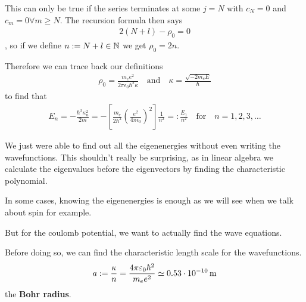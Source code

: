 This can only be true if the series terminates at some $j = N$ with $c_N = 0$ and $c_m = 0 \forall m \geq N$.
The recursion formula then says
\begin{align*}
	2(N+l) - \rho_0 = 0
\end{align*}
, so if we define $n := N + l \in \mathbb{N}$ we get $\rho_0 = 2n$.

Therefore we can trace back our definitions
\begin{align*}
	\rho_0 = \frac{m_e e^{2}}{2 \pi \epsilon_0 \hbar^{2} \kappa} \quad \text{and} \quad \kappa = \frac{\sqrt{-2m_e E}}{\hbar}
\end{align*}
to find that
\begin{align*}
	E_n = - \frac{\hbar^{2} \kappa_n^{2}}{2m} 
	=
	-\left[
		\frac{m_e}{2 \hbar^2} \left(
			\frac{e^{2}}{4\pi \epsilon_0}
		\right)^{2}		
	\right]
	\frac{1}{n^2} =: \frac{E_1}{n^2} \quad \text{for} \quad n = 1,2,3, \ldots
\end{align*}

We just were able to find out all the eigenenergies without even writing the wavefunctions. This shouldn't really be surprising, as in linear algebra we calculate the eigenvalues before the eigenvectors by finding the characteristic polynomial.

In some cases, knowing the eigenenergies is enough as we will see when we talk about spin for example.

But for the coulomb potential, we want to actually find the wave equations.

Before doing so, we can find the characteristic length scale for the wavefunctions.
\begin{align*}
	a := \frac{\kappa}{n} = \frac{4\pi \varepsilon_0 \hbar^{2}}{m_e e^{2}} \simeq 0.53 \cdot 10^{-10} \operatorname{m} 
\end{align*}
the \textbf{Bohr radius}.

